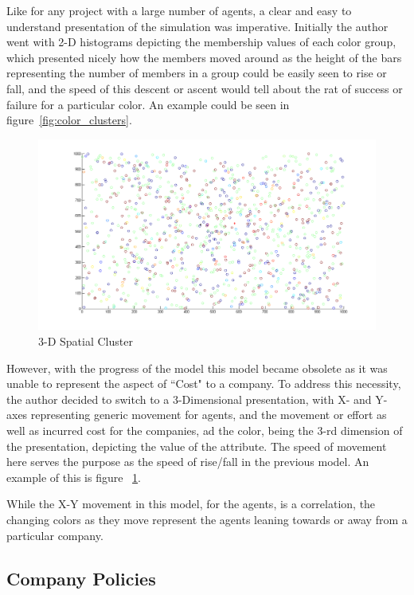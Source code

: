 Like for any project with a large number of agents, a clear and easy to understand presentation of the simulation was imperative.
Initially the author went with 2-D histograms depicting the membership values of each color group, which presented nicely how the members moved around as the height of the  bars representing the number of members in a group could be easily seen to rise or fall, and the speed of this descent or ascent would tell about the rat of success or failure for a particular color. An example could be seen in figure~\ref{fig:color_clusters}.

\begin{figure}
\includegraphics[scale=0.5]{Figures/spatial}
\caption{3-D Spatial Cluster}
\label{fig:spatial_clusters}
\end{figure}


However, with the progress of the model this model became obsolete as it was unable to represent the aspect of ``Cost" to a company. 
To address this necessity, the author decided to switch to a 3-Dimensional presentation, with X- and Y- axes representing generic movement for agents, and the movement or effort as well as incurred cost for the companies, ad the color, being the 3-rd dimension of the presentation, depicting the value of the attribute. The speed of movement here serves the purpose as the speed of rise/fall in the previous model. An example of this is figure ~\ref{fig:spatial_clusters}.

While the X-Y movement in this model, for the agents, is a correlation, the changing colors as they move represent the agents leaning towards or away from a particular company.

\subsection{Company Policies}

